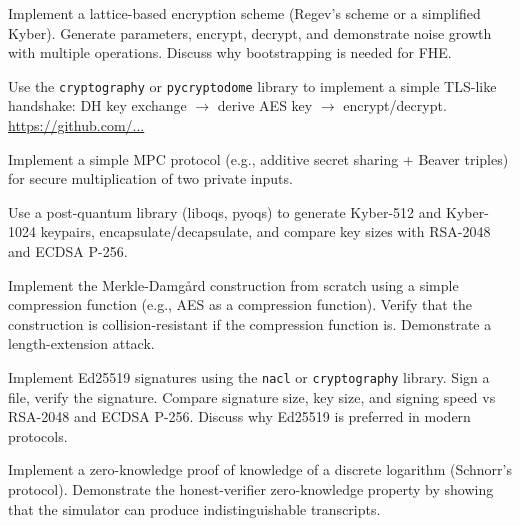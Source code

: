 \begin{exercise}[Challenge]
Implement a lattice-based encryption scheme (Regev's scheme or a simplified Kyber). Generate parameters, encrypt, decrypt, and demonstrate noise growth with multiple operations. Discuss why bootstrapping is needed for FHE.
\end{exercise}

\begin{exercise}[Computational]
Use the \texttt{cryptography} or \texttt{pycryptodome} library to implement a simple TLS-like handshake: DH key exchange $\to$ derive AES key $\to$ encrypt/decrypt. \url{https://github.com/...}
\end{exercise}

\begin{exercise}[Computational]
Implement a simple MPC protocol (e.g., additive secret sharing + Beaver triples) for secure multiplication of two private inputs.
\end{exercise}

\begin{exercise}[Computational]
Use a post-quantum library (liboqs, pyoqs) to generate Kyber-512 and Kyber-1024 keypairs, encapsulate/decapsulate, and compare key sizes with RSA-2048 and ECDSA P-256.
\end{exercise}

\begin{exercise}[Computational]
Implement the Merkle-Damgård construction from scratch using a simple compression function (e.g., AES as a compression function). Verify that the construction is collision-resistant if the compression function is. Demonstrate a length-extension attack.
\end{exercise}

\begin{exercise}[Computational]
Implement Ed25519 signatures using the \texttt{nacl} or \texttt{cryptography} library. Sign a file, verify the signature. Compare signature size, key size, and signing speed vs RSA-2048 and ECDSA P-256. Discuss why Ed25519 is preferred in modern protocols.
\end{exercise}

\begin{exercise}[Computational]
Implement a zero-knowledge proof of knowledge of a discrete logarithm (Schnorr's protocol). Demonstrate the honest-verifier zero-knowledge property by showing that the simulator can produce indistinguishable transcripts.
\end{exercise}

